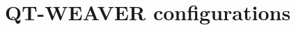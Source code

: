 \documentclass[10pt,a4paper]{article}
\begin{document}

        

            

        


    



\section{QT-WEAVER configurations}
\label{app:configurations}

\end{document}
